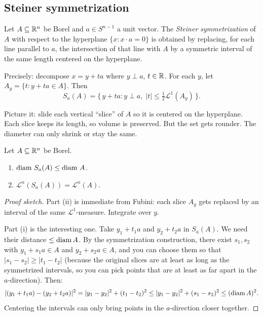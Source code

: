 \subsection{Steiner symmetrization}\label{subsec:steiner}

\begin{definition}\label{def:steiner}
Let $A \subseteq \mathbb{R}^n$ be Borel and $a \in S^{n-1}$ a unit vector. The
\emph{Steiner symmetrization} of $A$ with respect to the hyperplane
$\{x : x \cdot a = 0\}$ is obtained by replacing, for each line parallel
to $a$, the intersection of that line with $A$ by a symmetric interval of
the same length centered on the hyperplane.

Precisely: decompose $x = y + ta$ where $y \perp a$, $t \in \mathbb{R}$. For
each $y$, let $A_y = \{t : y + ta \in A\}$. Then
\[
  S_a(A) = \bigl\{\, y + ta : y \perp a,\;
    |t| \le \tfrac{1}{2}\mathcal{L}^1(A_y) \,\bigr\}.
\]
\end{definition}

Picture it: slide each vertical ``slice'' of $A$ so it is centered on the
hyperplane. Each slice keeps its length, so volume is preserved.
But the set gets rounder. The diameter can only shrink or stay the same.

\begin{lemma}\label{lem:steiner-props}
Let $A \subseteq \mathbb{R}^n$ be Borel.
\begin{enumerate}[nosep]
  \item $\operatorname{diam}\, S_a(A) \le \operatorname{diam}\, A$.
  \item $\mathcal{L}^n(S_a(A)) = \mathcal{L}^n(A)$.
\end{enumerate}
\end{lemma}

\begin{proof}[Proof sketch]
Part (ii) is immediate from Fubini: each slice $A_y$ gets replaced by an
interval of the same $\mathcal{L}^1$-measure. Integrate over $y$.

Part (i) is the interesting one. Take $y_1 + t_1 a$ and $y_2 + t_2 a$
in $S_a(A)$. We need their distance $\le \operatorname{diam} A$. By the symmetrization
construction, there exist $s_1, s_2$ with $y_1 + s_1 a \in A$ and
$y_2 + s_2 a \in A$, and you can choose them so that
$|s_1 - s_2| \ge |t_1 - t_2|$ (because the original slices are at least
as long as the symmetrized intervals, so you can pick points that are at
least as far apart in the $a$-direction). Then:
\[
  |{(y_1 + t_1 a) - (y_2 + t_2 a)}|^2
  = |y_1 - y_2|^2 + (t_1 - t_2)^2
  \le |y_1 - y_2|^2 + (s_1 - s_2)^2
  \le (\operatorname{diam} A)^2.
\]
Centering the intervals can only bring points in the
$a$-direction closer together. \qedhere
\end{proof}


